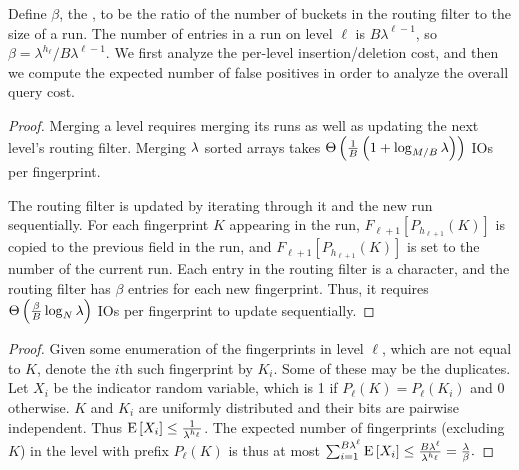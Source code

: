 Define $\beta$, the , to be the ratio of the number
of buckets in the routing filter to the size of a run. The number of entries in
a run on level $\ell$ is $B\lambda^{\ell-1}$, so $\beta =
\lambda^{h_\ell}/B\lambda^{\ell-1}$. We first analyze the per-level
insertion/deletion cost, and then we compute the expected number of false
positives in order to analyze the overall query cost.


\begin{proof}
	Merging a level requires merging its runs as well as updating the
	next level's routing filter. Merging $\lambda$ sorted arrays takes
	$\Theta\left(\frac{1}{B}\left(1 + \log_{M/B}\lambda\right)\right)$ IOs per
	fingerprint.
			
	The routing filter is updated by iterating through it and the new run
	sequentially. For each fingerprint $K$ appearing in the run,
	$F_{\ell+1}[P_{h_{\ell+1}}(K)]$ is copied to the previous field in the run,
	and $F_{\ell+1}[P_{h_{\ell+1}}(K)]$ is set to the number of the current
	run. Each entry in the routing filter is a character, and the routing
	filter has $\beta$ entries for each new fingerprint. Thus, it requires
	$\Theta\left(\frac{\beta}{B}\log_{N}{\lambda}\right)$ IOs per fingerprint to
	update sequentially. 
\end{proof}


\begin{proof}
	Given some enumeration of the fingerprints in level $\ell$, which are not
	equal to $K$, denote the $i$th such fingerprint by $K_i$. Some of these may
	be the duplicates. Let $X_i$ be the indicator random variable, which is 1
	if $P_\ell(K)=P_\ell(K_i)$ and 0 otherwise. $K$ and $K_i$ are
	uniformly distributed and their bits are pairwise independent.  Thus
	$\mathrm{E}\left[X_i\right] \leq \frac{1}{\lambda^{h_\ell}}$. The expected number of
	fingerprints (excluding $K$) in the level with prefix $P_\ell(K)$ is thus
	at most $\sum_{i=1}^{B \lambda^\ell}\mathrm{E}\left[X_i\right] \leq \frac{B
	\lambda^\ell}{\lambda^{h_\ell}} = \frac{\lambda}{\beta}.$
\end{proof}

